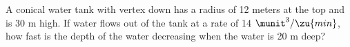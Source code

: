 A conical water tank with vertex down
has a radius of 12 meters at the top and is 30
m high. If water flows out of the tank at a
rate of 14 $\munit^3/\zu{min}$, how fast is the depth of
the water decreasing when the water is 20 m deep?\answercheck
